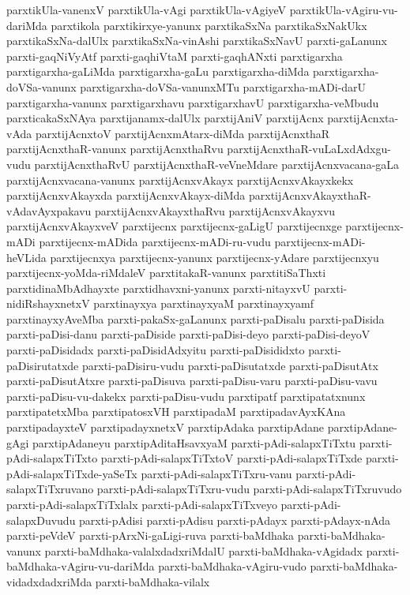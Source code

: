 {parxtikUla-vanenxV
parxtikUla-vAgi
parxtikUla-vAgiyeV
parxtikUla-vAgiru-vu-dariMda
parxtikola
parxtikirxye-yanunx
parxtikaSxNa
parxtikaSxNakUkx
parxtikaSxNa-dalUlx
parxtikaSxNa-vinAshi
parxtikaSxNavU
parxti-gaLanunx
parxti-gaqNiVyAtf
parxti-gaqhiVtaM
parxti-gaqhANxti
parxtigarxha
parxtigarxha-gaLiMda
parxtigarxha-gaLu
parxtigarxha-diMda
parxtigarxha-doVSa-vanunx
parxtigarxha-doVSa-vanunxMTu
parxtigarxha-mADi-darU
parxtigarxha-vanunx
parxtigarxhavu
parxtigarxhavU
parxtigarxha-veMbudu
parxticakaSxNAya
parxtijanamx-dalUlx
parxtijAniV
parxtijAcnx
parxtijAcnxta-vAda
parxtijAcnxtoV
parxtijAcnxmAtarx-diMda
parxtijAcnxthaR
parxtijAcnxthaR-vanunx
parxtijAcnxthaRvu
parxtijAcnxthaR-vuLaLxdAdxgu-vudu
parxtijAcnxthaRvU
parxtijAcnxthaR-veVneMdare
parxtijAcnxvacana-gaLa
parxtijAcnxvacana-vanunx
parxtijAcnxvAkayx
parxtijAcnxvAkayxkekx
parxtijAcnxvAkayxda
parxtijAcnxvAkayx-diMda
parxtijAcnxvAkayxthaR-vAdavAyxpakavu
parxtijAcnxvAkayxthaRvu
parxtijAcnxvAkayxvu
parxtijAcnxvAkayxveV
parxtijecnx
parxtijecnx-gaLigU
parxtijecnxge
parxtijecnx-mADi
parxtijecnx-mADida
parxtijecnx-mADi-ru-vudu
parxtijecnx-mADi-heVLida
parxtijecnxya
parxtijecnx-yanunx
parxtijecnx-yAdare
parxtijecnxyu
parxtijecnx-yoMda-riMdaleV
parxtitakaR-vanunx
parxtitiSaThxti
parxtidinaMbAdhayxte
parxtidhavxni-yanunx
parxti-nitayxvU
parxti-nidiRshayxnetxV
parxtinayxya
parxtinayxyaM
parxtinayxyamf
parxtinayxyAveMba
parxti-pakaSx-gaLanunx
parxti-paDisalu
parxti-paDisida
parxti-paDisi-danu
parxti-paDiside
parxti-paDisi-deyo
parxti-paDisi-deyoV
parxti-paDisidadx
parxti-paDisidAdxyitu
parxti-paDisididxto
parxti-paDisirutatxde
parxti-paDisiru-vudu
parxti-paDisutatxde
parxti-paDisutAtx
parxti-paDisutAtxre
parxti-paDisuva
parxti-paDisu-varu
parxti-paDisu-vavu
parxti-paDisu-vu-dakekx
parxti-paDisu-vudu
parxtipatf
parxtipatatxnunx
parxtipatetxMba
parxtipatosxVH
parxtipadaM
parxtipadavAyxKAna
parxtipadayxteV
parxtipadayxnetxV
parxtipAdaka
parxtipAdane
parxtipAdane-gAgi
parxtipAdaneyu
parxtipAditaHsavxyaM
parxti-pAdi-salapxTiTxtu
parxti-pAdi-salapxTiTxto
parxti-pAdi-salapxTiTxtoV
parxti-pAdi-salapxTiTxde
parxti-pAdi-salapxTiTxde-yaSeTx
parxti-pAdi-salapxTiTxru-vanu
parxti-pAdi-salapxTiTxruvano
parxti-pAdi-salapxTiTxru-vudu
parxti-pAdi-salapxTiTxruvudo
parxti-pAdi-salapxTiTxlalx
parxti-pAdi-salapxTiTxveyo
parxti-pAdi-salapxDuvudu
parxti-pAdisi
parxti-pAdisu
parxti-pAdayx
parxti-pAdayx-nAda
parxti-peVdeV
parxti-pArxNi-gaLigi-ruva
parxti-baMdhaka
parxti-baMdhaka-vanunx
parxti-baMdhaka-valalxdadxriMdalU
parxti-baMdhaka-vAgidadx
parxti-baMdhaka-vAgiru-vu-dariMda
parxti-baMdhaka-vAgiru-vudo
parxti-baMdhaka-vidadxdadxriMda
parxti-baMdhaka-vilalx
}
